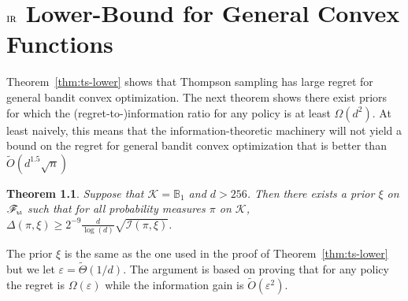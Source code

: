 \documentclass[letter, 12pt]{report}
\newcommand{\todoa}[2][]{\todo[size=\scriptsize,color=green!20!white,#1]{Alr: #2}}
\newcommand{\pb}{\text{\tiny\texttt{b}}}
\newcommand{\pl}{\text{\tiny\texttt{l}}}
\newcommand{\ball}{\mathbb{B}}
\newcommand{\cK}{\mathcal K}
\newcommand{\sF}{\mathscr F}
\newcommand{\I}{\mathcal{I}}
\newcommand{\1}{\mathbf{1}}
\newcommand{\IR}{\operatorname{\textsc{ir}}}
\renewcommand{\epsilon}{\varepsilon}
\theoremstyle{plain}
\newtheorem{theorem}{Theorem}
\theoremstyle{definition}
\theoremstyle{remark}
\begin{document}
\chapter{$\IR$ Lower-‌‌Bound for General Convex Functions}
Theorem~\ref{thm:ts-lower} shows that Thompson sampling has large regret for general bandit convex optimization.
The next theorem shows there exist priors for which the (regret-to-)information ratio for any policy is at least $\Omega(d^2)$.
At least naively, this means that the information-theoretic machinery will not yield a bound on the regret for general bandit convex optimization that
is better than $\tilde O(d^{1.5} \sqrt{n})$

\begin{theorem}\label{thm:inf-lower}
    Suppose that $\cK = \ball_1$ and $d>256$. Then there exists a prior $\xi$ on $\sF_{\pb\pl}$ such that for all probability measures $\pi$ on $\cK$,
    $\Delta(\pi, \xi) \geq 2^{-9} \frac{d}{\log(d)} \sqrt{\I(\pi, \xi)}$. %
\end{theorem}

The prior $\xi$ is the same as the one used in the proof of Theorem~\ref{thm:ts-lower} but we let $\epsilon = \tilde \Theta(1/d)$.
The argument is based on proving that for any policy the regret is $\Omega(\epsilon)$ while the information gain is $\tilde O(\epsilon^2)$.
\end{document}
